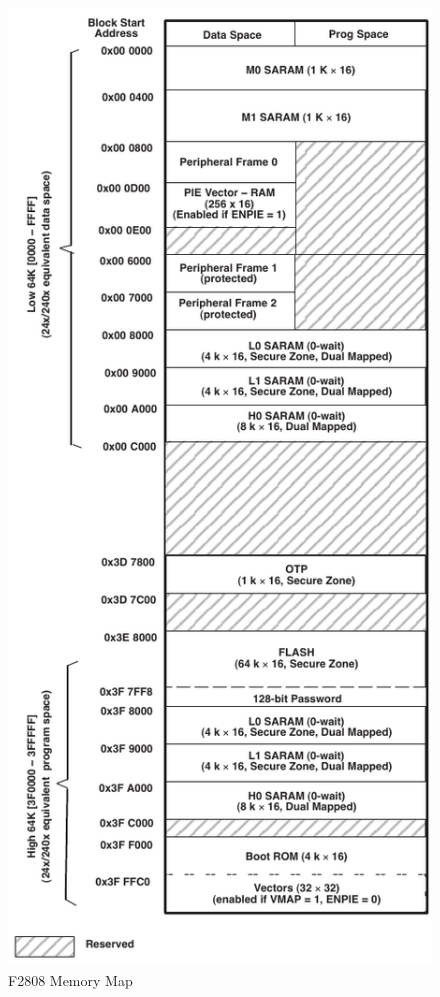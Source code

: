 \begin{figure}[ptb]
	\begin{centering}
		\includegraphics[scale=0.75]{Hardware/Figures/hardware-f2808_memory_map.pdf}
		\caption[F2808 Memory Map]{F2808 Memory Map \cite{ref:2006-ti-f2808_users_guide}}
		\label{fig:hardware:f2808_memory_map}
	\end{centering}
\end{figure}

